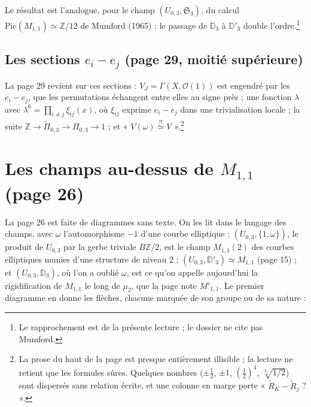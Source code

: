 \documentclass[11pt,a4paper]{article}
\begin{document}
Le résultat est l'analogue, pour le champ $(U_{0,3}, \mathfrak{S}_3)$, du calcul
$\mathrm{Pic}(M_{1,1}) \simeq \mathbb{Z}/12$ de Mumford (1965) : le passage de
$\mathbb{D}_3$ à $\mathbb{D}'_3$ double l'ordre.\footnote{Le rapprochement est de
la présente lecture ; le dossier ne cite pas Mumford.}

\subsection*{Les sections $e_i - e_j$ (page 29, moitié supérieure)}

La page 29 revient sur ces sections : $V_J = \Gamma(X, \mathcal{O}(1))$ est
engendré par les $e_i - e_j$, que les permutations échangent entre elles au signe
près ; une fonction $\lambda$ avec $\lambda^6 = \prod_{i \neq j}\xi_{ij}(x)$, où
$\xi_{ij}$ exprime $e_i - e_j$ dans une trivialisation locale ; la suite
$\mathbb{Z} \to \widetilde{\Pi}_{0,3} \to \Pi_{0,3} \to 1$ ; et
« $V(\omega) \overset{!!}{\simeq} V$ ».\footnote{La prose du haut de la page est
presque entièrement illisible ; la lecture ne retient que les formules sûres.
Quelques nombres ($\pm\frac12$, $\pm 1$, $(\frac12)^4$, $\sqrt[3]{1/2}$) sont
dispersés sans relation écrite, et une colonne en marge porte
« $\tilde R_K - \tilde R_j$ ? ».}

\section*{Les champs au-dessus de $M_{1,1}$ (page 26)}

La page 26 est faite de diagrammes sans texte. On les lit dans le langage des
champs, avec $\omega$ l'automorphisme $-1$ d'une courbe elliptique :
$(U_{0,3}, \{1, \omega\})$, le produit de $U_{0,3}$ par la gerbe triviale
$B\mathbb{Z}/2$, est le champ $M_{1,1}(2)$ des courbes elliptiques munies d'une
structure de niveau $2$ ; $(U_{0,3}, \mathbb{D}'_3) \simeq M_{1,1}$ (page 15) ; et
$(U_{0,3}, \mathbb{D}_3)$, où l'on a oublié $\omega$, est ce qu'on appelle
aujourd'hui la rigidification de $M_{1,1}$ le long de $\mu_2$, que la page note
$M'_{1,1}$. Le premier diagramme en donne les flèches, chacune marquée de son
groupe ou de sa nature :

\end{document}
